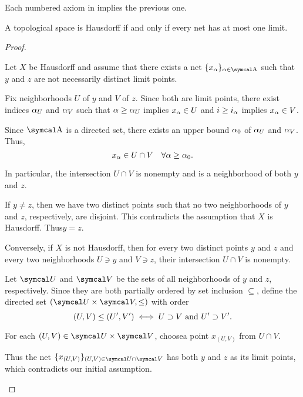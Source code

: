 \begin{proposition}\label{thm:separation_axioms_cascade}
  Each numbered axiom in  implies the previous one.
\end{proposition}

\begin{proposition}\label{thm:t2_iff_singleton_limits}
  A topological space is Hausdorff if and only if every net has at most one limit.
\end{proposition}
\begin{proof}\mbox{}
  \begin{description}
    \Implies Let \( X \) be Hausdorff and assume that there exists a net \( \{ x_\al \}_{\al \in \CA} \) such that \( y \) and \( z \) are not necessarily distinct limit points.

    Fix neighborhoods \( U \) of \( y \) and \( V \) of \( z \). Since both are limit points, there exist indices \( \alpha_U \) and \( \alpha_V \) such that \( \alpha \geq \alpha_U \) implies \( x_\alpha \in U \) and \( i \geq i_\alpha \) implies \( x_\alpha \in V \).

    Since \( \CA \) is a directed set, there exists an upper bound \( \alpha_0 \) of \( \alpha_U \) and \( \alpha_V \). Thus,
    \begin{equation*}
      x_\alpha \in U \cap V \quad\forall \alpha \geq \alpha_0.
    \end{equation*}

    In particular, the intersection \( U \cap V \) is nonempty and is a neighborhood of both \( y \) and \( z \).

    If \( y \neq z \), then we have two distinct points such that no two neighborhoods of \( y \) and \( z \), respectively, are disjoint. This contradicts the assumption that \( X \) is Hausdorff. Thus\LEM \( y = z \).

    \ImpliedBy Conversely, if \( X \) is not Hausdorff\LEM, then for every two distinct points \( y \) and \( z \) and every two neighborhoods \( U \ni y \) and \( V \ni z \), their intersection \( U \cap V \) is nonempty.

    Let \( \Cal{U} \) and \( \Cal{V} \) be the sets of all neighborhoods of \( y \) and \( z \), respectively. Since they are both partially ordered by set inclusion \( \subseteq \), define the directed set \( (\Cal{U} \times \Cal{V}, \leq) \) with order
    \begin{equation*}
      (U, V) \leq (U', V') \iff U \supset V \text{ and } U' \supset V'.
    \end{equation*}

    For each \( (U, V) \in \Cal{U} \times \Cal{V} \), choose\AOC a point \( x_{(U, V)} \) from \( U \cap V \).

    Thus the net \( \{ x_{(U, V)} \}_{(U, V) \in \Cal{U} \cap \Cal{V}} \) has both \( y \) and \( z \) as its limit points, which contradicts our initial assumption.
  \end{description}
\end{proof}

